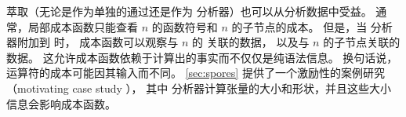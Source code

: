 萃取（无论是作为单独的通过还是作为 \eclass 分析器）也可以从分析数据中受益。
通常，局部成本函数只能查看 \enode $n$ 的函数符号和 $n$ 的子节点的成本。
但是，当 \eclass 分析器附加到 \egraph 时，
  成本函数可以观察与 $n$ 的 \eclass 关联的数据，
  以及与 $n$ 的子节点关联的数据。
这允许成本函数依赖于计算出的事实而不仅仅是纯语法信息。
换句话说，运算符的成本可能因其输入而不同。
\autoref{sec:spores} 提供了一个激励性的案例研究（motivating case study ），%
  其中 \eclass 分析器计算张量的大小和形状，并且这些大小信息会影响成本函数。

